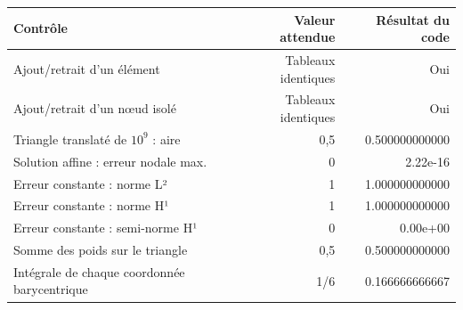 \begin{tabular}{p{7cm}rr}
\toprule
Contrôle & Valeur attendue & Résultat du code \\
\midrule
Ajout/retrait d’un élément & Tableaux identiques & Oui \\
Ajout/retrait d’un nœud isolé & Tableaux identiques & Oui \\
Triangle translaté de $10^9$ : aire & 0,5 & 0.500000000000 \\
Solution affine : erreur nodale max. & 0 & 2.22e-16 \\
Erreur constante : norme L² & 1 & 1.000000000000 \\
Erreur constante : norme H¹ & 1 & 1.000000000000 \\
Erreur constante : semi-norme H¹ & 0 & 0.00e+00 \\
Somme des poids sur le triangle & 0,5 & 0.500000000000 \\
Intégrale de chaque coordonnée barycentrique & 1/6 & 0.166666666667 \\
\bottomrule
\end{tabular}
